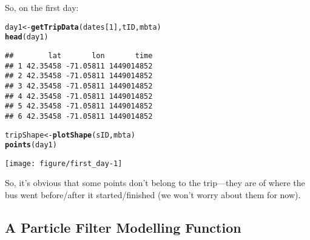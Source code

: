 \documentclass[11pt]{article}\usepackage[]{graphicx}\usepackage[]{color}
\makeatletter
\def\maxwidth{ %
  \ifdim\Gin@nat@width>\linewidth
    \linewidth
  \else
    \Gin@nat@width
  \fi
}
\newcommand{\hlnum}[1]{\textcolor[rgb]{0.686,0.059,0.569}{#1}}%
\newcommand{\hlstd}[1]{\textcolor[rgb]{0.345,0.345,0.345}{#1}}%
\newcommand{\hlkwb}[1]{\textcolor[rgb]{0.69,0.353,0.396}{#1}}%
\newcommand{\hlkwd}[1]{\textcolor[rgb]{0.737,0.353,0.396}{\textbf{#1}}}%
\newenvironment{kframe}{%
 \def\at@end@of@kframe{}%
 \ifinner\ifhmode%
  \def\at@end@of@kframe{\end{minipage}}%
  \begin{minipage}{\columnwidth}%
 \fi\fi%
 \def\FrameCommand##1{\hskip\@totalleftmargin \hskip-\fboxsep
 \colorbox{shadecolor}{##1}\hskip-\fboxsep
     \hskip-\linewidth \hskip-\@totalleftmargin \hskip\columnwidth}%
 \MakeFramed {\advance\hsize-\width
   \@totalleftmargin\z@ \linewidth\hsize
   \@setminipage}}%
 {\par\unskip\endMakeFramed%
 \at@end@of@kframe}
\newenvironment{knitrout}{}{} %
\makeatother
\begin{document}
So, on the first day:
\begin{knitrout}
\color{fgcolor}\begin{kframe}
\begin{alltt}
\hlstd{day1} \hlkwb{<-} \hlkwd{getTripData}\hlstd{(dates[}\hlnum{1}\hlstd{], tID, mbta)}
\hlkwd{head}\hlstd{(day1)}
\end{alltt}
\begin{verbatim}
##        lat       lon       time
## 1 42.35458 -71.05811 1449014852
## 2 42.35458 -71.05811 1449014852
## 3 42.35458 -71.05811 1449014852
## 4 42.35458 -71.05811 1449014852
## 5 42.35458 -71.05811 1449014852
## 6 42.35458 -71.05811 1449014852
\end{verbatim}
\begin{alltt}
\hlstd{tripShape} \hlkwb{<-} \hlkwd{plotShape}\hlstd{(sID, mbta)}
\hlkwd{points}\hlstd{(day1)}
\end{alltt}
\end{kframe}

{\centering \texttt{[image: figure/first\_day-1]} 

}



\end{knitrout}

So, it's obvious that some points don't belong to the trip---they are of where the bus went
before/after it started/finished (we won't worry about them for now).

\subsection{A Particle Filter Modelling Function}
\end{document}
